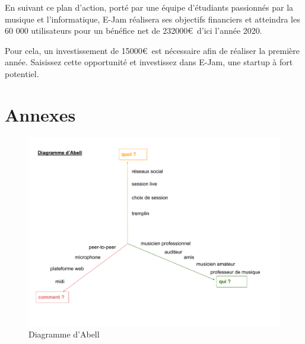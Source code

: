 \documentclass[a4,12pt]{article}
\begin{document}
En suivant ce plan d'action, porté par une équipe d'étudiants passionnés par la
musique et l'informatique, E-Jam réalisera ses objectifs financiers et atteindra
les 60 000 utilisateurs pour un bénéfice net de 232000\euro\ d'ici l'année 2020.

Pour cela, un investissement de 15000\euro\ est nécessaire afin de réaliser la première année.
Saisissez cette opportunité et investissez dans E-Jam, une startup à fort potentiel.

\newpage
\section{Annexes}

\begin{figure}[!h]
    \centering
    \includegraphics[width=400pt]{Abell.pdf}
    \caption{Diagramme d'Abell}
    \label{fig:diagrammeAbel}
\end{figure}
\end{document}
